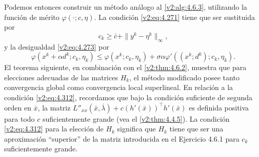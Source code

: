 Podemos entonces construir un método análogo al \cref{v2:alg:4.6.3}, utilizando la función de mérito $\varphi(\cdot; c, \eta)$. La condición \eqref{v2:eq:4.271} tiene que ser sustituida por
\begin{equation}
c_k \ge \bar{c} + \|y^k - \eta^k\|_\infty,
\label{v2:eq:4.310}
\end{equation}
y la desigualdad \eqref{v2:eq:4.273} por
\begin{equation}
\varphi(x^k + \alpha d^k; c_k, \eta_k) \le \varphi(x^k; c_k, \eta_k) + \sigma \alpha \varphi'((x^k; d^k); c_k, \eta_k).
\label{v2:eq:4.311}
\end{equation}
El teorema siguiente, en combinación con el \cref{v2:thm:4.6.2}, muestra que para elecciones adecuadas de las matrices $H_k$, el método modificado posee tanto convergencia global como convergencia local superlineal. En relación a la condición \eqref{v2:eq:4.312}, recordamos que bajo la condición suficiente de segunda orden en $\bar{x}$, la matriz $L''_{xx}(\bar{x}, \bar{\lambda}) + c(h'(\bar{x}))^\top h'(\bar{x})$ es definida positiva para todo $c$ suficientemente grande (vea el \cref{v2:thm:4.4.5}). La condición \eqref{v2:eq:4.312} para la elección de $H_k$ significa que $H_k$ tiene que ser una aproximación ``superior'' de la matriz introducida en el Ejercicio 4.6.1 para $c_k$ suficientemente grande.

